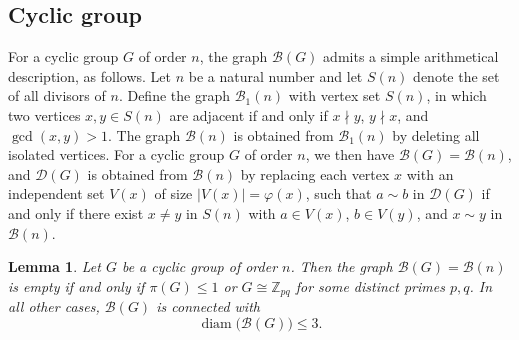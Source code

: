 \documentclass[12pt]{amsart}
\theoremstyle{plain}
\newtheorem{lemma}[theorem]{Lemma}
\theoremstyle{remark}
\theoremstyle{definition}
\begin{document}
\subsection{Cyclic group}
For a cyclic group $G$ of order $n$, the graph $\mathcal{B}(G)$ admits a simple arithmetical description, as follows. Let $n$ be a natural number and let $S(n)$ denote the set of all divisors of $n$. Define the graph $\mathcal{B}_1(n)$ with vertex set $S(n)$, in which two vertices $x, y \in S(n)$ are adjacent if and only if $x \nmid y$, $y \nmid x$, and $\gcd(x,y) > 1$. The graph $\mathcal{B}(n)$ is obtained from $\mathcal{B}_1(n)$ by deleting all isolated vertices. For a cyclic group $G$ of order $n$, we then have $\mathcal{B}(G) = \mathcal{B}(n)$, and $\mathcal{D}(G)$ is obtained from $\mathcal{B}(n)$ by replacing each vertex $x$ with an independent set $V(x)$ of size $|V(x)| = \varphi(x)$, such that $a \sim b$ in $\mathcal{D}(G)$ if and only if there exist $x \neq y$ in $S(n)$ with $a \in V(x)$, $b \in V(y)$, and $x \sim y$ in $\mathcal{B}(n)$.


\begin{lemma}\label{lemma:diam(B(G))-g-cyclic}
Let $G$ be a cyclic group of order $n$. Then the graph $\mathcal{B}(G) = \mathcal{B}(n)$ is empty if and only if $\pi(G) \leq 1$ or $G \cong \mathbb{Z}_{pq}$ for some distinct primes $p,q$. In all other cases, $\mathcal{B}(G)$ is connected with
\[
\operatorname{diam}\big(\mathcal{B}(G)\big) \leq 3.
\]
\end{lemma}
\end{document}
